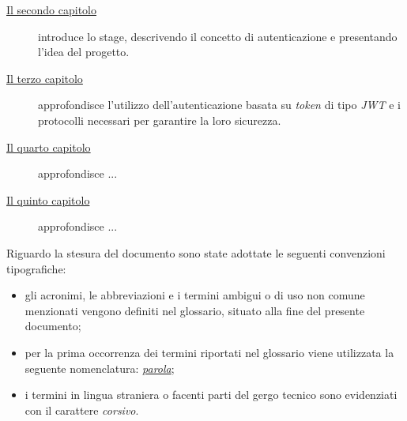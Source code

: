 \begin{description}
    \item[{\hyperref[cap:inquadramento-stage]{Il secondo capitolo}}] introduce lo stage, descrivendo il concetto di autenticazione e presentando l'idea del progetto.
    
    \item[{\hyperref[cap:autenticazione-jwt]{Il terzo capitolo}}] approfondisce l'utilizzo dell'autenticazione basata su \emph{\gls{token}} di tipo \emph{JWT} e i protocolli necessari per garantire la loro sicurezza.
    
    \item[{\hyperref[cap:analisi-requisiti]{Il quarto capitolo}}] approfondisce ...
    
    \item[{\hyperref[cap:progettazione-codifica]{Il quinto capitolo}}] approfondisce ...
\end{description}

Riguardo la stesura del documento sono state adottate le seguenti convenzioni tipografiche:
\begin{itemize}
	\item gli acronimi, le abbreviazioni e i termini ambigui o di uso non comune menzionati vengono definiti nel glossario, situato alla fine del presente documento;
	\item per la prima occorrenza dei termini riportati nel glossario viene utilizzata la seguente nomenclatura: \emph{\hyperref[sec:organizzazione-documento]{parola}};
	\item i termini in lingua straniera o facenti parti del gergo tecnico sono evidenziati con il carattere \emph{corsivo}.
\end{itemize}
